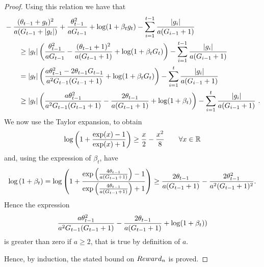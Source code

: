 \begin{proof}
Using this relation we have that
\begin{align*}
&-\frac{(\theta_{t-1}+g_t)^2}{a (G_{t-1}+|g_t|)} + \frac{\theta_{t-1}^2}{a G_{t-1}}+\log(1+\beta_t g_t)-\sum_{i=1}^{t-1} \frac{|g_i|}{a (G_{i-1} + 1)} \\
&\qquad \geq |g_t| \left(\frac{\theta_{t-1}^2}{a G_{t-1}} - \frac{(\theta_{t-1}+1)^2}{a (G_{t-1} + 1)} + \log(1+\beta_t G_t)\right) - \sum_{i=1}^{t-1} \frac{|g_i|}{a (G_{i-1} + 1)}\\
&\qquad = |g_t| \left(\frac{a \theta_{t-1}^2 -2 \theta_{t-1} G_{t-1} }{a^2 G_{t-1}(G_{t-1} + 1)} + \log(1+\beta_t G_t)\right) - \sum_{i=1}^{t} \frac{|g_i|}{a (G_{i-1} + 1)}\\
&\qquad \geq |g_t| \left(\frac{a \theta_{t-1}^2}{a^2 G_{t-1}(G_{t-1} + 1)}-\frac{2 \theta_{t-1}}{a (G_{t-1} + 1)} + \log(1+\beta_t)\right) - \sum_{i=1}^{t} \frac{|g_i|}{a (G_{i-1} + 1)}~.
\end{align*}
We now use the Taylor expansion, to obtain
\[
\log\left(1+\frac{\exp(x)-1}{\exp(x)+1}\right) \geq \frac{x}{2} -\frac{x^2}{8} \qquad \forall x \in \mathbb{R}
\]
and, using the expression of $\beta_t$, have
\[
\log\left(1+\beta_t\right) 
= \log\left(1+\frac{\exp\left(\frac{4 \theta_{t-1}}{a (G_{t-1} + 1)}\right)-1}{\exp\left(\frac{4 \theta_{t-1}}{a (G_{t-1} + 1)}\right)+1}\right) 
\geq \frac{2 \theta_{t-1}}{a (G_{t-1} + 1)} -\frac{2 \theta_{t-1}^2}{a^2 (G_{t-1} + 1)^2}.
\]
Hence the expression 
\[
\frac{a \theta_{t-1}^2}{a^2 G_{t-1}(G_{t-1} + 1)}-\frac{2 \theta_{t-1}}{a (G_{t-1} + 1)} + \log(1+\beta_t))
\]
is greater than zero if $a \geq 2$, that is true by definition of $a$.

Hence, by induction, the stated bound on $Reward_n$ is proved.
\end{proof}